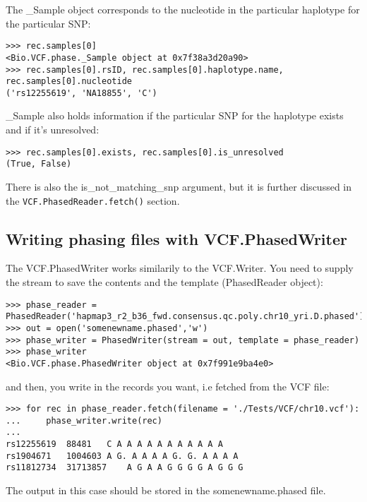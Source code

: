 \noindent The \_Sample object corresponds to the nucleotide in the particular haplotype for the particular SNP:

\begin{verbatim}
>>> rec.samples[0]
<Bio.VCF.phase._Sample object at 0x7f38a3d20a90>
>>> rec.samples[0].rsID, rec.samples[0].haplotype.name, rec.samples[0].nucleotide
('rs12255619', 'NA18855', 'C')
\end{verbatim}

\noindent \_Sample also holds information if the particular SNP for the haplotype exists and if it's unresolved:

\begin{verbatim}
>>> rec.samples[0].exists, rec.samples[0].is_unresolved
(True, False)
\end{verbatim}

\noindent There is also the is\_not\_matching\_snp argument, but it is further discussed in the \verb|VCF.PhasedReader.fetch()|
section.

\subsection{Writing phasing files with VCF.PhasedWriter}

\noindent The VCF.PhasedWriter works similarily to the VCF.Writer. You need to supply the stream to save the contents and
the template (PhasedReader object):

\begin{verbatim}
>>> phase_reader = PhasedReader('hapmap3_r2_b36_fwd.consensus.qc.poly.chr10_yri.D.phased')
>>> out = open('somenewname.phased','w')
>>> phase_writer = PhasedWriter(stream = out, template = phase_reader)
>>> phase_writer
<Bio.VCF.phase.PhasedWriter object at 0x7f991e9ba4e0>
\end{verbatim}

\noindent and then, you write in the records you want, i.e fetched from the VCF file:

\begin{verbatim}
>>> for rec in phase_reader.fetch(filename = './Tests/VCF/chr10.vcf'):
...     phase_writer.write(rec)
...
rs12255619	88481	C A A A A A A A A A A A
rs1904671	1004603	A G. A A A A G. G. A A A A
rs11812734	31713857	A G A A G G G G A G G G

\end{verbatim}

\noindent The output in this case should be stored in the somenewname.phased file.

